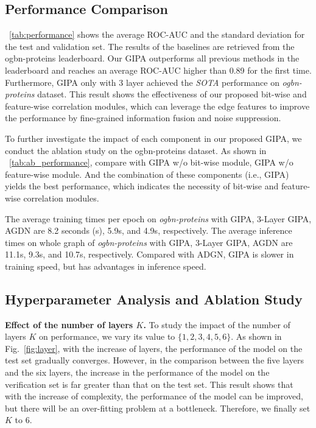\documentclass[runningheads]{llncs}
\newcommand{\model}{GIPA\xspace}
\begin{document}
\subsection{Performance Comparison}
\tablename~\ref{tab:performance} shows the average ROC-AUC and the standard deviation for the test and validation set.
The results of the baselines are retrieved from the ogbn-proteins leaderboard\footnotemark[8]. 
Our \model outperforms all previous methods in the leaderboard and reaches an average ROC-AUC higher than 0.89 for the first time. 
Furthermore, \model only with 3 layer achieved the \textit{SOTA} performance on \textit{ogbn-proteins} dataset.
This result shows the effectiveness of our proposed bit-wise and feature-wise correlation modules, which can leverage the edge features to improve the performance by fine-grained information fusion and noise suppression. 

To further investigate the impact of each component in our proposed \model, we conduct the ablation study on the ogbn-proteins dataset. 
As shown in \tablename~\ref{tab:ab_performance}, compare with \model w/o bit-wise module, \model w/o feature-wise module. And the combination of these components (i.e., \model) yields the best performance, which indicates the necessity of bit-wise and feature-wise correlation modules.

The average training times per epoch on \textit{ogbn-proteins} with \model, 3-Layer \model, AGDN are 8.2 seconds (s), 5.9s, and 4.9s, respectively. 
The average inference times on whole graph of \textit{ogbn-proteins} with \model, 3-Layer \model, AGDN  are 11.1s, 9.3s, and 10.7s, respectively. 
Compared with ADGN, \model is slower in training speed, but has advantages in inference speed.


\subsection{Hyperparameter Analysis and Ablation Study}\label{Hyperparameter}
\noindent \textbf{Effect of the number of layers $K$.} To study the impact of the number of layers $K$ on performance, we vary its value to $\{1, 2, 3, 4, 5 ,6\}$. As shown in Fig.~\ref{fig:layer}, with the increase of layers, the performance of the model on the test set gradually converges. However, in the comparison between the five layers and the six layers, the increase in the performance of the model on the verification set is far greater than that on the test set. This result shows that with the increase of complexity, the performance of the model can be improved, but there will be an over-fitting problem at a bottleneck. Therefore, we finally set $K$ to 6.
\end{document}
